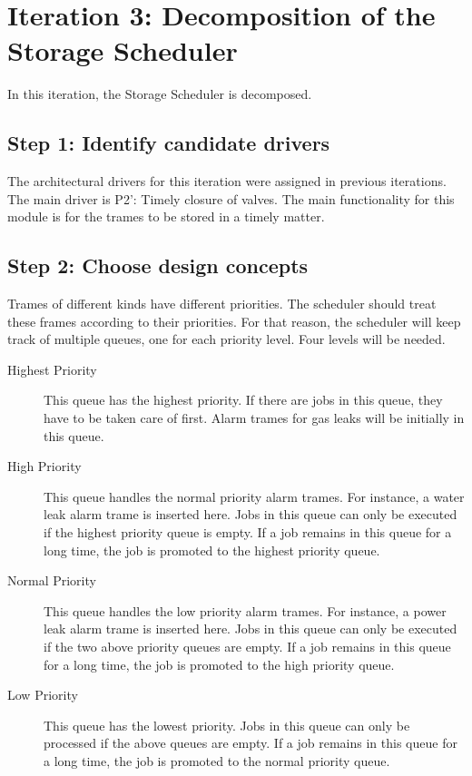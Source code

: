 \section{Iteration 3: Decomposition of the Storage Scheduler}
\label{add:it3}

\npar In this iteration, the Storage Scheduler is decomposed. 

\subsection{Step 1: Identify candidate drivers}
\label{add:it3/drivers}

\npar The architectural drivers for this iteration were assigned in previous
iterations. The main driver is P2': Timely closure of valves. The main
functionality for this module is for the trames to be stored in a timely matter.

\subsection{Step 2: Choose design concepts}
\label{add:it3/concepts}

\npar Trames of different kinds have different priorities. The scheduler should
treat these frames according to their priorities. For that reason, the scheduler
will keep track of multiple queues, one for each priority level. Four levels
will be needed. 

\begin{description}
	\item[Highest Priority] This queue has the highest priority. If there are jobs
	in this queue, they have to be taken care of first. Alarm trames for gas leaks
	will be initially in this queue. 
	\item[High Priority] This queue handles the normal priority alarm trames. For
	instance, a water leak alarm trame is inserted here. Jobs in this queue can
	only be executed if the highest priority queue is empty. If a job remains in
	this queue for a long time, the job is promoted to the highest priority queue. 
	\item[Normal Priority] This queue handles the low priority alarm trames. For
	instance, a power leak alarm trame is inserted here. Jobs in this queue can
	only be executed if the two above priority queues are empty. If a job remains
	in this queue for a long time, the job is promoted to the high priority queue. 
	\item[Low Priority] This queue has the lowest priority. Jobs in this queue can
	only be processed if the above queues are empty. If a job remains in this queue
	for a long time, the job is promoted to the normal priority queue.
\end{description}

